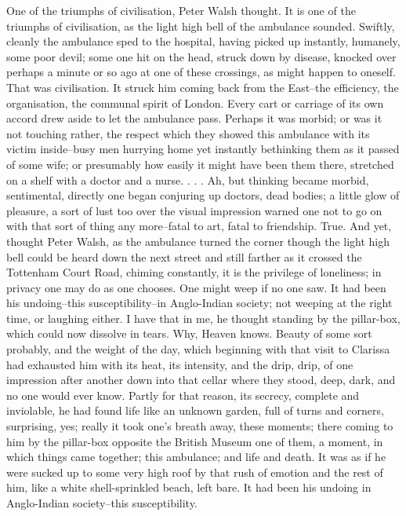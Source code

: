\documentclass[lang=cn,10pt]{elegantbook}
\begin{document}
One of the triumphs of civilisation, Peter Walsh thought.  It is
one of the triumphs of civilisation, as the light high bell of the
ambulance sounded.  Swiftly, cleanly the ambulance sped to the
hospital, having picked up instantly, humanely, some poor devil;
some one hit on the head, struck down by disease, knocked over
perhaps a minute or so ago at one of these crossings, as might
happen to oneself.  That was civilisation.  It struck him coming
back from the East--the efficiency, the organisation, the communal
spirit of London.  Every cart or carriage of its own accord drew
aside to let the ambulance pass.  Perhaps it was morbid; or was it
not touching rather, the respect which they showed this ambulance
with its victim inside--busy men hurrying home yet instantly
bethinking them as it passed of some wife; or presumably how easily
it might have been them there, stretched on a shelf with a doctor
and a nurse. . . .  Ah, but thinking became morbid, sentimental,
directly one began conjuring up doctors, dead bodies; a little glow
of pleasure, a sort of lust too over the visual impression warned
one not to go on with that sort of thing any more--fatal to art,
fatal to friendship.  True.  And yet, thought Peter Walsh, as the
ambulance turned the corner though the light high bell could be
heard down the next street and still farther as it crossed the
Tottenham Court Road, chiming constantly, it is the privilege of
loneliness; in privacy one may do as one chooses.  One might weep
if no one saw.  It had been his undoing--this susceptibility--in
Anglo-Indian society; not weeping at the right time, or laughing
either.  I have that in me, he thought standing by the pillar-box,
which could now dissolve in tears.  Why, Heaven knows.  Beauty of
some sort probably, and the weight of the day, which beginning with
that visit to Clarissa had exhausted him with its heat, its
intensity, and the drip, drip, of one impression after another down
into that cellar where they stood, deep, dark, and no one would
ever know.  Partly for that reason, its secrecy, complete and
inviolable, he had found life like an unknown garden, full of turns
and corners, surprising, yes; really it took one's breath away,
these moments; there coming to him by the pillar-box opposite the
British Museum one of them, a moment, in which things came
together; this ambulance; and life and death.  It was as if he were
sucked up to some very high roof by that rush of emotion and the
rest of him, like a white shell-sprinkled beach, left bare.  It had
been his undoing in Anglo-Indian society--this susceptibility.
\end{document}
